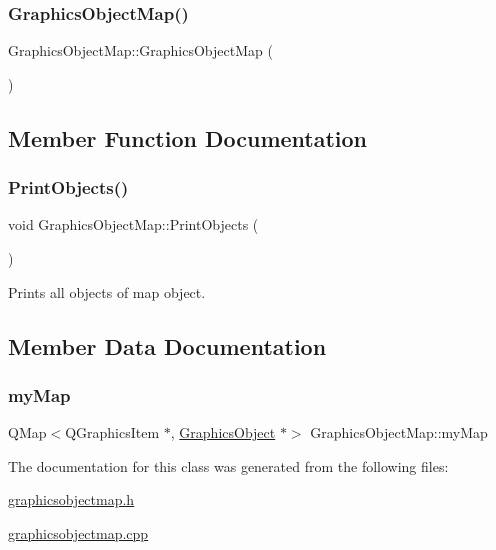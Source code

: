 \subsubsection{\texorpdfstring{Graphics\+Object\+Map()}{GraphicsObjectMap()}}
{\footnotesize\ttfamily Graphics\+Object\+Map\+::\+Graphics\+Object\+Map (\begin{DoxyParamCaption}{ }\end{DoxyParamCaption})}



\subsection{Member Function Documentation}
\mbox{\label{class_graphics_object_map_a5e9632b78470d797613114dae0382028}} 
\subsubsection{\texorpdfstring{Print\+Objects()}{PrintObjects()}}
{\footnotesize\ttfamily void Graphics\+Object\+Map\+::\+Print\+Objects (\begin{DoxyParamCaption}{ }\end{DoxyParamCaption})}



Prints all objects of map object. 



\subsection{Member Data Documentation}
\mbox{\label{class_graphics_object_map_a6b59cd95bfc0fcbec8037e12edc7a3e1}} 
\subsubsection{\texorpdfstring{my\+Map}{myMap}}
{\footnotesize\ttfamily Q\+Map$<$Q\+Graphics\+Item $\ast$, \hyperlink{class_graphics_object}{Graphics\+Object} $\ast$$>$ Graphics\+Object\+Map\+::my\+Map}



The documentation for this class was generated from the following files\+:\begin{DoxyCompactItemize}
\item 
\hyperlink{graphicsobjectmap_8h}{graphicsobjectmap.\+h}\item 
\hyperlink{graphicsobjectmap_8cpp}{graphicsobjectmap.\+cpp}\end{DoxyCompactItemize}
